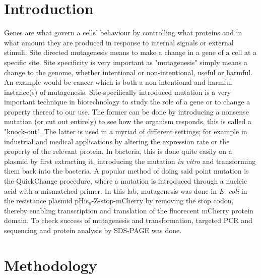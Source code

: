 \documentclass[11pt,a4paper]{article}
\begin{document}
\setcounter{page}{1}

\section{Introduction}
Genes are what govern a cells’ behaviour by controlling what proteins and in what amount they are produced  in response to internal signals or external stimuli. Site directed mutagenesis means to make a change in a gene of a cell at a specific site. Site specificity is very important as "mutagenesis" simply means a change to the genome, whether intentional or non-intentional, useful or harmful. An example would be cancer which is both a non-intentional and harmful instance(s) of mutagenesis. Site-specifically introduced mutation is a very important technique in biotechnology to study the role of a gene or to change a property thereof to our use. The former can be done by introducing a nonsense mutation (or cut out entirely) to see how the organism responds, this is called a "knock-out". The latter is used in a myriad of different settings; for example in industrial and medical applications by altering the expression rate or the property of the relevant protein. In bacteria, this is done quite easily on a plasmid by first extracting it, introducing the mutation \textit{in vitro} and transforming them back into the bacteria. A popular method of doing said point mutation is the QuickChange procedure, where a mutation is introduced through a nucleic acid with a mismatched primer. In this lab, mutagenesis was done in \textit{E. coli} in the resistance plasmid pHis$_6$-Z-stop-mCherry by removing the stop codon, thereby enabling transcription and translation of the fluorecent mCherry protein domain. To check success of mutagenesis and transformation, targeted PCR and sequencing and protein analysis by SDS-PAGE was done. 
\section{Methodology}
\end{document}
